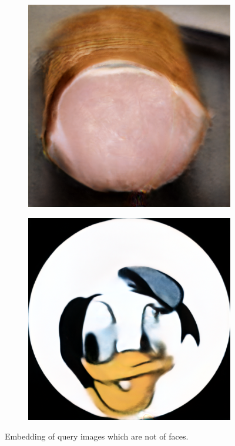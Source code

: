 \begin{figure}[h!]
\begin{subfigure}[b]{0.24\textwidth}
    \end{subfigure}

    \begin{subfigure}[b]{0.24\textwidth}
        \includegraphics[width=\textwidth]{fig/stylegan/noface/skinkerecon}
    \end{subfigure}
    \begin{subfigure}[b]{0.24\textwidth}
        \includegraphics[width=\textwidth]{fig/stylegan/noface/andrecon}
    \end{subfigure}
    \caption{Embedding of query images which are not of faces.}
    \label{noface}
\end{figure}

